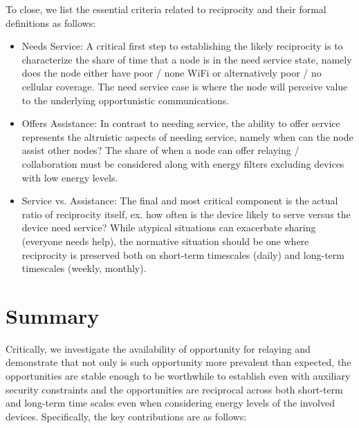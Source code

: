 To close, we list the essential criteria related to reciprocity and their formal definitions as follows:

\begin{itemize}

\item Needs Service: A critical first step to establishing the likely reciprocity is to characterize the share of time that a node is in the need service state, namely does the node either have poor / none WiFi or alternatively poor / no cellular coverage. The need service case is where the node will perceive value to the underlying opportunistic communications.

\item Offers Assistance: In contrast to needing service, the ability to offer service represents the altruistic aspects of needing service, namely when can the node assist other nodes? The share of when a node can offer relaying / collaboration must be considered along with energy filters excluding devices with low energy levels.

\item Service vs. Assistance: The final and most critical component is the actual ratio of reciprocity itself, ex. how often is the device likely to serve versus the device need service? While atypical situations can exacerbate sharing (everyone needs help), the normative situation should be one where reciprocity is preserved both on short-term timescales (daily) and long-term timescales (weekly, monthly).

\end{itemize}

\section{Summary}

Critically, we investigate the availability of opportunity for relaying and demonstrate that not only is such opportunity more prevalent than expected, the opportunities are stable enough to be worthwhile to establish even with auxiliary security constraints and the opportunities are reciprocal across both short-term and long-term time scales even when considering energy levels of the involved devices. Specifically, the key contributions are as follows:

